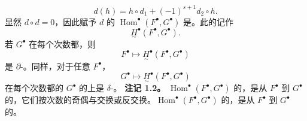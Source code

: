 \[d(h)=h\circ d_1+(-1)^{s+1}d_2\circ h.\tag{3}\]
显然 $d\circ d=0$，因此赋予 $d$ 的 $\operatorname{Hom}^{\bullet}(F^{\bullet},G^{\bullet})$ 是。此的记作
\[\underset{\sim}{H}^{\bullet}(F^{\bullet},G^{\bullet}).\tag{4}\]
若 $G^{\bullet}$ 在每个次数都，则
\[F^{\bullet}\longmapsto\underset{\sim}{H}^{\bullet}(F^{\bullet},G^{\bullet})\]
是 $\partial$-。同样，对于任意 $F^{\bullet}$，
\[G^{\bullet}\longmapsto\underset{\sim}{H}^{\bullet}(F^{\bullet},G^{\bullet})\]
在每个次数都的 $G^{\bullet}$ 的上是 $\delta$-。
\textbf{注记 1.2。} $\operatorname{Hom}^{\bullet}(F^{\bullet},G^{\bullet})$ 的，是从 $F^{\bullet}$ 到 $G^{\bullet}$ 的，它们按次数的奇偶与交换或反交换。$\operatorname{Hom}^{\bullet}(F^{\bullet},G^{\bullet})$ 的，是从 $F^{\bullet}$ 到 $G^{\bullet}$ 的。

